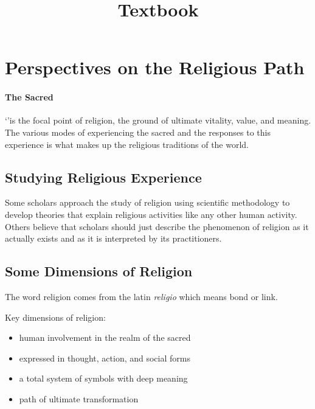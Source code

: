 \documentclass{article}
\begin{document}
\title{Textbook}
\maketitle

\tableofcontents

\section{Perspectives on the Religious Path}
\label{sec:perspectives_on_the_religious_path}

\paragraph{The Sacred}
`'is the focal point of religion, the ground of ultimate vitality, value, and meaning. The various modes of experiencing the sacred and the responses to this experience is what makes up the religious traditions of the world.

\subsection{Studying Religious Experience}
\label{sub:studying_religious_experience}
Some scholars approach the study of religion using scientific methodology to develop theories that explain religious activities like any other human activity. Others believe that scholars should just describe the phenomenon of religion as it actually exists and as it is interpreted by its practitioners.

\subsection{Some Dimensions of Religion}
\label{sub:some_dimensions_of_religion}
The word religion comes from the latin \emph{religio} which means bond or link.

Key dimensions of religion:
\begin{itemize}
	\item human involvement in the realm of the sacred
	\item expressed in thought, action, and social forms
	\item a total system of symbols with deep meaning
	\item path of ultimate transformation
\end{itemize}
\end{document}
